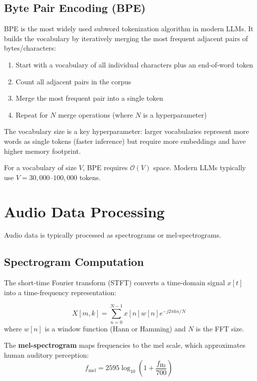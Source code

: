 \subsection{Byte Pair Encoding (BPE)}

BPE \cite{sennrich2016neural} is the most widely used subword tokenization algorithm in modern LLMs. It builds the vocabulary by iteratively merging the most frequent adjacent pairs of bytes/characters:

\begin{enumerate}
    \item Start with a vocabulary of all individual characters plus an end-of-word token
    \item Count all adjacent pairs in the corpus
    \item Merge the most frequent pair into a single token
    \item Repeat for $N$ merge operations (where $N$ is a hyperparameter)
\end{enumerate}

The vocabulary size is a key hyperparameter: larger vocabularies represent more words as single tokens (faster inference) but require more embeddings and have higher memory footprint.

For a vocabulary of size $V$, BPE requires $\mathcal{O}(V)$ space. Modern LLMs typically use $V = 30{,}000$--$100{,}000$ tokens.

\section{Audio Data Processing}

Audio data is typically processed as spectrograms or mel-spectrograms.

\subsection{Spectrogram Computation}

The short-time Fourier transform (STFT) converts a time-domain signal $x[t]$ into a time-frequency representation:

\begin{equation}
X[m, k] = \sum_{n=0}^{N-1} x[n] w[n] e^{-j 2\pi kn/N}
\end{equation}
where $w[n]$ is a window function (Hann or Hamming) and $N$ is the FFT size.

The \textbf{mel-spectrogram} maps frequencies to the mel scale, which approximates human auditory perception:
\begin{equation}
f_{\text{mel}} = 2595 \log_{10}\!\left(1 + \frac{f_{\text{Hz}}}{700}\right)
\end{equation}

